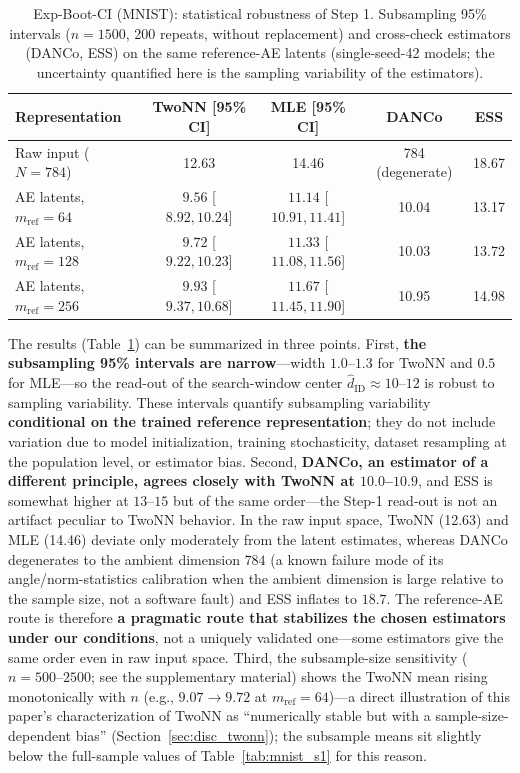 \documentclass[make,article,submit,pdftex,moreauthors]{Definitions/mdpi}
\newcommand{\hatdID}{\hat{d}_{\mathrm{ID}}}
\begin{document}
\begin{table}[H]
\caption{Exp-Boot-CI (MNIST): statistical robustness of Step 1.
Subsampling 95\% intervals ($n = 1500$, 200 repeats, without replacement)
and cross-check estimators (DANCo, ESS) on the same reference-AE latents
(single-seed-42 models; the uncertainty quantified here is the sampling
variability of the estimators).}
\label{tab:boot_ci}
\small
\begin{tabular}{lcccc}
\toprule
\textbf{Representation} & \textbf{TwoNN [95\% CI]} & \textbf{MLE [95\% CI]} & \textbf{DANCo} & \textbf{ESS} \\
\midrule
Raw input ($N = 784$) & 12.63 & 14.46 & 784 (degenerate) & 18.67 \\
\midrule
AE latents, $m_{\mathrm{ref}} = 64$  & $9.56$ [$8.92, 10.24$] & $11.14$ [$10.91, 11.41$] & 10.04 & 13.17 \\
AE latents, $m_{\mathrm{ref}} = 128$ & $9.72$ [$9.22, 10.23$] & $11.33$ [$11.08, 11.56$] & 10.03 & 13.72 \\
AE latents, $m_{\mathrm{ref}} = 256$ & $9.93$ [$9.37, 10.68$] & $11.67$ [$11.45, 11.90$] & 10.95 & 14.98 \\
\bottomrule
\end{tabular}
\end{table}

The results (Table~\ref{tab:boot_ci}) can be summarized in three points.
First, \textbf{the subsampling 95\% intervals are narrow}---width
$1.0$--$1.3$ for TwoNN and $0.5$ for MLE---so the read-out of the
search-window center $\hatdID \approx 10$--$12$ is robust to sampling
variability.
These intervals quantify subsampling variability \textbf{conditional on the
trained reference representation}; they do not include variation due to
model initialization, training stochasticity, dataset resampling at the
population level, or estimator bias.
Second, \textbf{DANCo, an estimator of a different principle, agrees
closely with TwoNN at $10.0$--$10.9$}, and ESS is somewhat higher at
$13$--$15$ but of the same order---the Step-1 read-out is not an artifact
peculiar to TwoNN behavior.
In the raw input space, TwoNN (12.63) and MLE (14.46) deviate only
moderately from the latent estimates, whereas DANCo degenerates to the
ambient dimension $784$ (a known failure mode of its angle/norm-statistics
calibration when the ambient dimension is large relative to the sample
size, not a software fault) and ESS inflates to $18.7$.
The reference-AE route is therefore \textbf{a pragmatic route that
stabilizes the chosen estimators under our conditions}, not a uniquely
validated one---some estimators give the same order even in raw input
space.
Third, the subsample-size sensitivity ($n = 500$--$2500$; see the
supplementary material) shows the TwoNN mean rising monotonically with $n$
(e.g., $9.07 \to 9.72$ at $m_{\mathrm{ref}} = 64$)---a direct illustration
of this paper's characterization of TwoNN as ``numerically stable but with
a sample-size-dependent bias'' (Section~\ref{sec:disc_twonn}); the
subsample means sit slightly below the full-sample values of
Table~\ref{tab:mnist_s1} for this reason.
\end{document}
